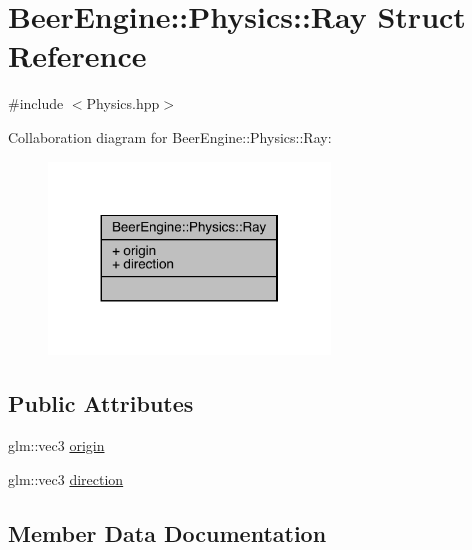 \hypertarget{struct_beer_engine_1_1_physics_1_1_ray}{}\section{Beer\+Engine\+:\+:Physics\+:\+:Ray Struct Reference}
\label{struct_beer_engine_1_1_physics_1_1_ray}


{\ttfamily \#include $<$Physics.\+hpp$>$}



Collaboration diagram for Beer\+Engine\+:\+:Physics\+:\+:Ray\+:\nopagebreak
\begin{figure}[H]
\begin{center}
\leavevmode
\includegraphics[width=212pt]{struct_beer_engine_1_1_physics_1_1_ray__coll__graph}
\end{center}
\end{figure}
\subsection*{Public Attributes}
\begin{DoxyCompactItemize}
\item 
glm\+::vec3 \mbox{\hyperlink{struct_beer_engine_1_1_physics_1_1_ray_a50d88f408e39fb77275d23074ef4c99f}{origin}}
\item 
glm\+::vec3 \mbox{\hyperlink{struct_beer_engine_1_1_physics_1_1_ray_ad70d648a97475b6109d09d6c710fac4b}{direction}}
\end{DoxyCompactItemize}


\subsection{Member Data Documentation}
\mbox{\label{struct_beer_engine_1_1_physics_1_1_ray_ad70d648a97475b6109d09d6c710fac4b}} 
